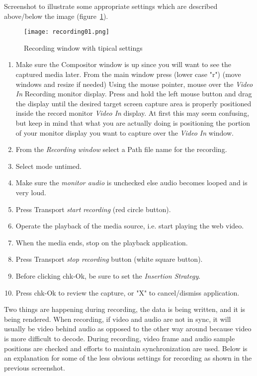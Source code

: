 Screenshot to illustrate some appropriate settings which are described above/below the image (figure~\ref{fig:recording01}).

\begin{figure}[htpb]
    \centering
    \texttt{[image: recording01.png]}
    \caption{Recording window with tipical settings}
    \label{fig:recording01}
\end{figure}

\begin{enumerate}[start=3]    
    \item Make sure the Compositor window is up since you will want to see the captured media later. From the main window press (lower case "r") (move windows and resize if needed) Using the mouse pointer, mouse over the \textit{Video In} Recording monitor display. Press and hold the left mouse button and drag the display until the desired target screen capture area is properly positioned inside the record monitor \textit{Video In} display.  At first this may seem confusing, but keep in mind that what you are actually doing is positioning the portion of your monitor display you want to capture over the \textit{Video In} window.
    \item From the \textit{Recording window} select a Path file name for the recording.
    \item Select mode untimed.
    \item Make sure the \textit{monitor audio} is unchecked else audio becomes looped and is very loud.
    \item Press Transport \textit{start recording} (red circle button).
    \item Operate the playback of the media source, i.e. start playing the web video.
    \item When the media ends, stop on the playback application.
    \item Press Transport \textit{stop recording} button (white square button).
    \item Before clicking chk-Ok, be sure to set the \textit{Insertion Strategy}.
    \item Press chk-Ok to review the capture, or "X" to cancel/dismiss application.    
\end{enumerate}

Two things are happening during recording, the data is being written, and it is being rendered.  When recording, if video and audio are not in sync, it will usually be video behind audio as opposed to the other way around because video is more difficult to decode.  During recording, video frame and audio sample positions are checked and efforts to maintain synchronization are used.   Below is an explanation for some of the less obvious settings for recording as shown in the previous screenshot.
